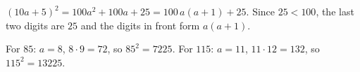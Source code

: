 $(10a+5)^2=100a^2+100a+25=100\,a(a+1)+25$. Since $25<100$, the last two digits are $25$ and the digits in front form $a(a+1)$.

For $85$: $a=8$, $8\cdot9=72$, so $85^2=\boxed{7225}$. For $115$: $a=11$, $11\cdot12=132$, so $115^2=\boxed{13225}$.

